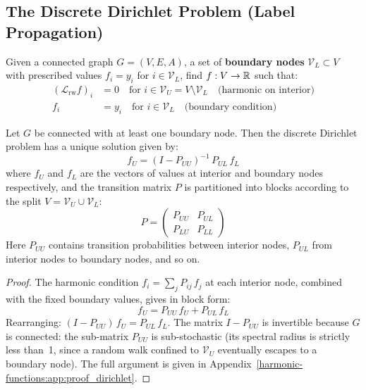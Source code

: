 \begin{notechapter}
\subsection{The Discrete Dirichlet Problem (Label Propagation)}

\begin{definition}
\label{harmonic-functions:def:graph_dirichlet}
Given a connected graph $G = (V, E, A)$, a set of \textbf{boundary nodes}
$\mathcal{V}_L \subset V$ with prescribed values $f_i = y_i$ for
$i \in \mathcal{V}_L$, find $f : V \to \mathbb{R}$ such that:
\begin{align}
(\mathcal{L}_{\mathrm{rw}} f)_i &= 0 \quad \text{for }
  i \in \mathcal{V}_U = V \setminus \mathcal{V}_L
  \quad\text{(harmonic on interior)} \\
f_i &= y_i \quad \text{for } i \in \mathcal{V}_L
  \quad\text{(boundary condition)}
\end{align}
\end{definition}

\begin{theorem}
\label{harmonic-functions:thm:discrete_dirichlet}
Let $G$ be connected with at least one boundary node. Then the discrete
Dirichlet problem has a unique solution given by:
\begin{equation}
f_U = (I - P_{UU})^{-1}\,P_{UL}\,f_L
\end{equation}
where $f_U$ and $f_L$ are the vectors of values at interior and boundary
nodes respectively, and the transition matrix $P$ is partitioned into blocks
according to the split $V = \mathcal{V}_U \cup \mathcal{V}_L$:
\begin{equation}
P = \begin{pmatrix} P_{UU} & P_{UL} \\ P_{LU} & P_{LL} \end{pmatrix}
\end{equation}
Here $P_{UU}$ contains transition probabilities between interior nodes,
$P_{UL}$ from interior nodes to boundary nodes, and so on.
\end{theorem}

\begin{proof}
The harmonic condition $f_i = \sum_j P_{ij}\,f_j$ at each interior node,
combined with the fixed boundary values, gives in block form:
\[
f_U = P_{UU}\,f_U + P_{UL}\,f_L
\]
Rearranging: $(I - P_{UU})\,f_U = P_{UL}\,f_L$. The matrix $I - P_{UU}$ is
invertible because $G$ is connected: the sub-matrix $P_{UU}$ is
sub-stochastic (its spectral radius is strictly less than~1, since a random
walk confined to $\mathcal{V}_U$ eventually escapes to a boundary node). The
full argument is given in Appendix~\ref{harmonic-functions:app:proof_dirichlet}.
\end{proof}


\end{notechapter}
